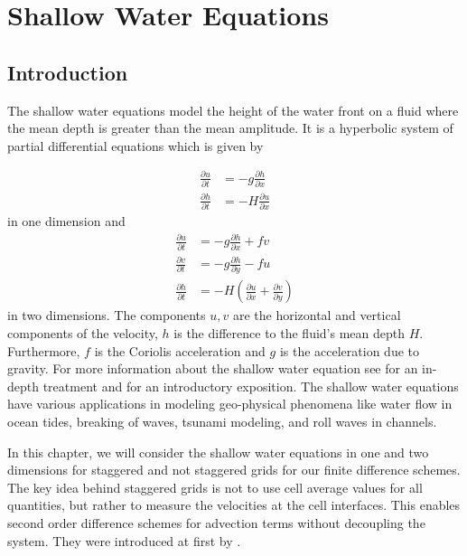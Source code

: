 \chapter{Shallow Water Equations}
\section{Introduction}

The shallow water equations model the height of the water front on a fluid where the mean depth is
greater than the mean amplitude. It is a hyperbolic system of partial differential equations which is
given by

\begin{align}
    \label{eq:swe1}
    \frac{\partial u}{\partial t} &= - g \frac{\partial h}{\partial x} \\
    \frac{\partial h}{\partial t} &= - H \frac{\partial u}{\partial x}
\end{align}
in one dimension and
\begin{align}
    \label{eq:swe2}
    \frac{\partial u}{\partial t} &= - g \frac{\partial h}{\partial x} + fv \\
    \frac{\partial v}{\partial t} &= -g \frac{\partial h}{\partial y} - fu\\ 
    \frac{\partial h}{\partial t} &= - H\left(\frac{\partial u}{\partial x} + \frac{\partial v}{\partial y}\right)
\end{align}
in two dimensions. The components $u, v$ are the horizontal and vertical components of the
velocity, $h$ is the difference to the fluid's mean depth $H$. Furthermore, $f$ is the Coriolis
acceleration and $g$ is the acceleration due to gravity. For more information about the
shallow water equation see \cite{Toro2024} for an in-depth treatment and \cite{Doos2022} for
an introductory exposition. The shallow water equations have various applications in modeling
geo-physical phenomena like water flow in ocean tides, breaking of waves, tsunami modeling, and roll
waves in channels. 

In this chapter, we will consider the shallow water equations in one and two dimensions for staggered and
not staggered grids for our finite difference schemes. The key idea behind staggered grids is not to
use cell average values for all quantities, but rather to measure the velocities at the
cell interfaces. This enables second order difference schemes for advection terms without
decoupling the system. They were introduced at first by \cite{Arakawa1977}.

